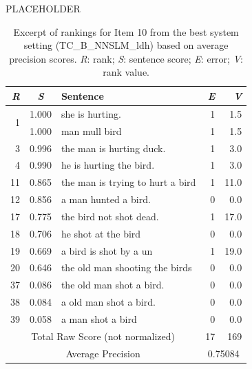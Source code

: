 \documentclass[final,t]{beamer}
\begin{document}
\begin{frame}{}
\begin{columns}[t]
\begin{column}{.64\linewidth}
\begin{columns}
\begin{column}{.49\linewidth}
\begin{block}{PLACEHOLDER}
\begin{table}[htb!]
\begin{center}
\setlength{\tabcolsep}{0.3em}
\begin{tabular}{|r|c|l|r|r|}
 \hline
 \textit{R} & \textit{S} & Sentence & \textit{E} & \textit{V}\\
 \hline
 \hline
\multirow{2}{*}{1} & 1.000 & she is hurting. & 1 & 1.5 \\
& 1.000 & man mull bird & 1 & 1.5 \\
\hline
3 & 0.996 & the man is hurting duck. & 1 & 3.0 \\
4 & 0.990 & he is hurting the bird. & 1 & 3.0 \\
\hline
11 & 0.865 & the man is trying to hurt a bird & 1 & 11.0 \\
12 & 0.856 & a man hunted a bird. & 0 & 0.0 \\
\hline
17 & 0.775 & the bird not shot dead.  & 1 & 17.0 \\
18 & 0.706 & he shot at the bird & 0 & 0.0 \\
19 & 0.669 & a bird is shot by a un & 1 & 19.0 \\
20 & 0.646 & the old man shooting the birds & 0 & 0.0 \\
\hline
37 & 0.086 & the old man shot a bird. & 0 & 0.0 \\
38 & 0.084 & a old man shot a bird. & 0 & 0.0 \\
39 & 0.058 & a man shot a bird & 0 & 0.0 \\
  \hline
  \hline
  \multicolumn{3}{|c|}{Total Raw Score (not normalized)} & 17 & 169 \\
  \hline
  \multicolumn{3}{|c|}{Average Precision} & \multicolumn{2}{c|}{0.75084} \\
 \hline
\end{tabular}
\begin{minipage}{.9\textwidth}
\vspace{.7em}
\caption{Excerpt of rankings for Item 10 from the best system setting (TC\_B\_NNSLM\_ldh) based on average precision scores. \textit{R}: rank; \textit{S}: sentence score; \textit{E}: error; \textit{V}: rank value. }
\label{tab:i10responses-avgprec}
\end{minipage}
\end{center}
\end{table}
\end{block}


\end{column}
\end{columns}
\end{column}
\end{columns}
\end{frame}
\end{document}
